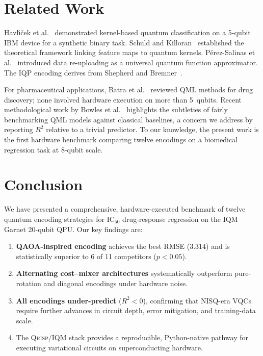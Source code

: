 \documentclass[twocolumn,aps,pra,superscriptaddress,floatfix]{revtex4-2}
\newcommand{\qrisp}{\textsc{Qrisp}}
\newcommand{\iqm}{\textsc{IQM}}
\begin{document}
\section{Related Work}
\label{sec:related}

Havl\'{\i}\v{c}ek et al.~\cite{havlicek2019} demonstrated kernel-based
quantum classification on a 5-qubit IBM device for a synthetic binary task.
Schuld and Killoran~\cite{schuld2021kernel} established the theoretical framework
linking feature maps to quantum kernels.
P\'{e}rez-Salinas et al.~\cite{perezSalinas2020} introduced data re-uploading
as a universal quantum function approximator.
The IQP encoding derives from Shepherd and Bremner~\cite{shepherd2009}.

For pharmaceutical applications, Batra et al.~\cite{batra2021} reviewed QML
methods for drug discovery; none involved hardware execution on more than
5~qubits.
Recent methodological work by Bowles et al.~\cite{bowles2024} highlights
the subtleties of fairly benchmarking QML models against classical baselines,
a concern we address by reporting $R^2$ relative to a trivial predictor.
To our knowledge, the present work is the first hardware benchmark comparing
twelve encodings on a biomedical regression task at 8-qubit scale.

\clearpage
\section{Conclusion}
\label{sec:conclusion}

We have presented a comprehensive, hardware-executed benchmark of twelve quantum
encoding strategies for IC$_{50}$ drug-response regression on the \iqm{} Garnet
20-qubit QPU. Our key findings are:

\begin{enumerate}
  \item \textbf{QAOA-inspired encoding} achieves the best RMSE ($3.314$) and
        is statistically superior to 6 of 11 competitors ($p<0.05$).
  \item \textbf{Alternating cost--mixer architectures} systematically
        outperform pure-rotation and diagonal encodings under hardware noise.
  \item \textbf{All encodings under-predict} ($R^2<0$), confirming that
        NISQ-era VQCs require further advances in circuit depth, error
        mitigation, and training-data scale.
  \item The \qrisp{}/\iqm{} stack provides a reproducible, Python-native
        pathway for executing variational circuits on superconducting hardware.
\end{enumerate}
\end{document}
